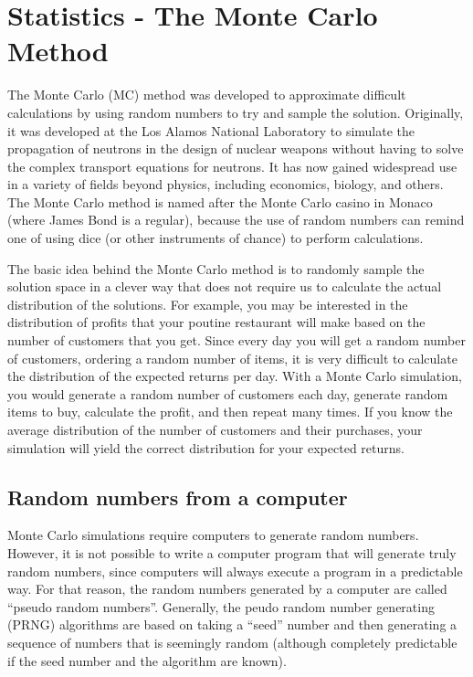 %
\chapter{Statistics - The Monte Carlo Method}
\label{Chap:statMonteCarlo}
The Monte Carlo (MC) method was developed to approximate difficult calculations by using random numbers to try and sample the solution. Originally, it was developed at the Los Alamos National Laboratory to simulate the propagation of neutrons in the design of nuclear weapons without having to solve the complex transport equations for neutrons. It has now gained widespread use in a variety of fields beyond physics, including economics, biology, and others. The Monte Carlo method is named after the Monte Carlo casino in Monaco (where James Bond is a regular), because the use of random numbers can remind one of using dice (or other instruments of chance) to perform calculations.

The basic idea behind the Monte Carlo method is to randomly sample the solution space in a clever way that does not require us to calculate the actual distribution of the solutions. For example, you may be interested in the distribution of profits that your poutine restaurant will make based on the number of customers that you get. Since every day you will get a random number of customers, ordering a random number of items, it is very difficult to calculate the distribution of the expected returns per day. With a Monte Carlo simulation, you would generate a random number of customers each day, generate random items to buy, calculate the profit, and then repeat many times. If you know the average distribution of the number of customers and their purchases, your simulation will yield the correct distribution for your expected returns.

\section{Random numbers from a computer}
Monte Carlo simulations require computers to generate random numbers. However, it is not possible to write a computer program that will generate truly random numbers, since computers will always execute a program in a predictable way. For that reason, the random numbers generated by a computer are called ``pseudo random numbers''. Generally, the peudo random number generating (PRNG) algorithms are based on taking a ``seed'' number and then generating a sequence of numbers that is seemingly random (although completely predictable if the seed number and the algorithm are known). 

